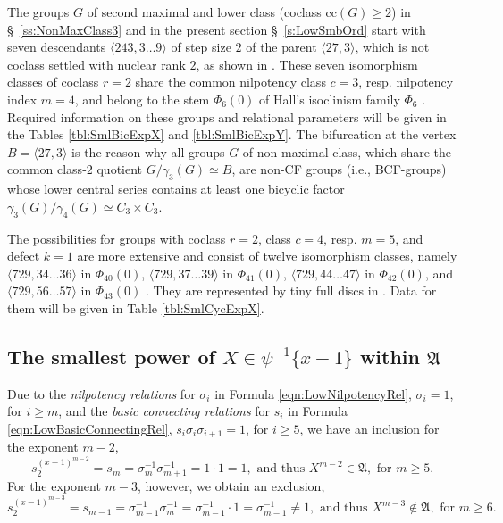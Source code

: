 \documentclass{amsart}
\theoremstyle{definition}
\numberwithin{equation}{section}
\begin{document}
The groups \(G\) of second maximal and lower class (coclass \(\mathrm{cc}(G)\ge 2\)) in \S\
\ref{ss:NonMaxClass3}
and in the present section \S\
\ref{s:LowSmbOrd}
start with seven descendants \(\langle 243,3\ldots 9\rangle\)
of step size \(2\) of the parent \(\langle 27,3\rangle\), which is not coclass settled with nuclear rank \(2\),
as shown in
\cite[Fig. 4, p. 171]{Ma6}.
These seven isomorphism classes of coclass \(r=2\) share the common nilpotency class \(c=3\), resp. nilpotency index \(m=4\),
and belong to the stem \(\Phi_6(0)\) of Hall's isoclinism family \(\Phi_6\)
\cite{Hl}.
Required information on these groups and relational parameters will be given in the Tables
\ref{tbl:SmlBicExpX}
and
\ref{tbl:SmlBicExpY}.
The bifurcation at the vertex \(B=\langle 27,3\rangle\) is the reason why all groups \(G\) of non-maximal class,
which share the common class-\(2\) quotient \(G/\gamma_3(G)\simeq B\),
are non-CF groups (i.e., BCF-groups) whose lower central series contains at least one bicyclic factor
\(\gamma_3(G)/\gamma_4(G)\simeq C_3\times C_3\).

The possibilities for groups with coclass \(r=2\), class \(c=4\), resp. \(m=5\), and defect \(k=1\)
are more extensive and consist of twelve isomorphism classes, namely
\(\langle 729,34\ldots 36\rangle\) in \(\Phi_{40}(0)\),
\(\langle 729,37\ldots 39\rangle\) in \(\Phi_{41}(0)\),
\(\langle 729,44\ldots 47\rangle\) in \(\Phi_{42}(0)\), and
\(\langle 729,56\ldots 57\rangle\) in \(\Phi_{43}(0)\)
\cite{Ef,Jm}.
They are represented by tiny full discs in
\cite[Fig. 4, p. 171]{Ma6}.
Data for them will be given in Table
\ref{tbl:SmlCycExpX}.



\subsection{The smallest power of \(X\in\psi^{-1}\lbrace x-1\rbrace\) within \(\mathfrak{A}\)}
\label{ss:LowPowX}

\noindent
Due to the \textit{nilpotency relations} for \(\sigma_i\) in Formula
\eqref{eqn:LowNilpotencyRel},
\(\sigma_i=1\), for \(i\ge m\),
and the \textit{basic connecting relations} for \(s_i\) in Formula
\eqref{eqn:LowBasicConnectingRel},
\(s_i\sigma_i\sigma_{i+1}=1\), for \(i\ge 5\),
we have an inclusion for the exponent \(m-2\),
\[s_2^{(x-1)^{m-2}}=s_m=\sigma_m^{-1}\sigma_{m+1}^{-1}=1\cdot 1=1,
\text{ and thus } X^{m-2}\in\mathfrak{A}, \text{ for } m\ge 5.\]
For the exponent \(m-3\), however, we obtain an exclusion,
\[s_2^{(x-1)^{m-3}}=s_{m-1}=\sigma_{m-1}^{-1}\sigma_m^{-1}=\sigma_{m-1}^{-1}\cdot 1=\sigma_{m-1}^{-1}\ne 1,
\text{ and thus } X^{m-3}\not\in\mathfrak{A}, \text{ for } m\ge 6.\]
\end{document}
